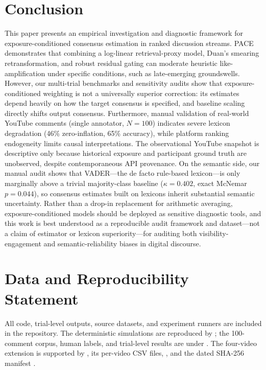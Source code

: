 \documentclass[journal]{IEEEtran}
\begin{document}
\section{Conclusion}
This paper presents an empirical investigation and diagnostic framework for exposure-conditioned consensus estimation in ranked discussion streams. PACE demonstrates that combining a log-linear retrieval-proxy model, Duan's smearing retransformation, and robust residual gating can moderate heuristic like-amplification under specific conditions, such as late-emerging groundswells. However, our multi-trial benchmarks and sensitivity audits show that exposure-conditioned weighting is not a universally superior correction: its estimates depend heavily on how the target consensus is specified, and baseline scaling directly shifts output consensus. Furthermore, manual validation of real-world YouTube comments (single annotator, $N = 100$) indicates severe lexicon degradation (46\% zero-inflation, 65\% accuracy), while platform ranking endogeneity limits causal interpretations. The observational YouTube snapshot is descriptive only because historical exposure and participant ground truth are unobserved, despite contemporaneous API provenance. On the semantic side, our manual audit shows that VADER---the de facto rule-based lexicon---is only marginally above a trivial majority-class baseline ($\kappa = 0.402$, exact McNemar $p = 0.044$), so consensus estimates built on lexicons inherit substantial semantic uncertainty. Rather than a drop-in replacement for arithmetic averaging, exposure-conditioned models should be deployed as sensitive diagnostic tools, and this work is best understood as a reproducible audit framework and dataset---not a claim of estimator or lexicon superiority---for auditing both visibility-engagement and semantic-reliability biases in digital discourse.

\section*{Data and Reproducibility Statement}
All code, trial-level outputs, source datasets, and experiment runners are included in the repository. The deterministic simulations are reproduced by ; the 100-comment corpus, human labels, and trial-level results are under . The four-video extension is supported by , its per-video CSV files, , and the dated SHA-256 manifest .



\end{document}
